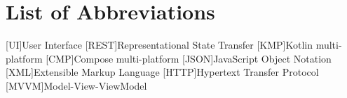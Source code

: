 \documentclass[english, sem, kiv, he, iso690alph, pdf, viewonly]{fasthesis}
\begin{document}
%
%
%
%

\appendix
%
%
%
%
\chapter{List of Abbreviations}\label{app:abbreviations}

\begin{acronym}
	[UI]{User Interface}
	[REST]{Representational State Transfer}
	[KMP]{Kotlin multi-platform}
	[CMP]{Compose multi-platform}
	[JSON]{JavaScript Object Notation}
	[XML]{Extensible Markup Language}
	[HTTP]{Hypertext Transfer Protocol}
	[MVVM]{Model-View-ViewModel}
\end{acronym}


%
%
%
%
\backmatter
\listoffigures 
\listoftables
\listoflistings
%
%
\backpage
\end{document}
